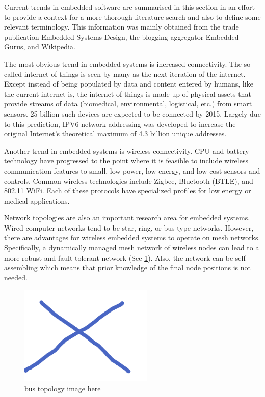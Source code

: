 \documentclass[draftcls,onecolumn,conference,12pt]{IEEEtran}
\begin{document}
Current trends in embedded software are summarised in this section in an effort to provide a context for a more thorough literature search and also to define some relevant terminology.  This information was mainly obtained from the trade publication Embedded Systems Design, the blogging aggregator Embedded Gurus, and Wikipedia.  

The most obvious trend in embedded systems is increased connectivity.  The so-called internet of things is seen by many as the next iteration of the internet. Except instead of being populated by data and content entered by humans, like the current internet is, the internet of things is made up of physical assets that provide streams of data (biomedical, environmental, logistical, etc.) from smart sensors.  25 billion such devices are expected to be connected by 2015. Largely due to this prediction, IPV6 network addressing was developed to increase the original Internet’s theoretical maximum of 4.3 billion unique addresses.  

Another trend in embedded systems is wireless connectivity.  CPU and battery technology have progressed to the point where it is feasible to include wireless communication features to small, low power, low energy, and low cost sensors and controls.  Common wireless technologies include Zigbee, Bluetooth (BTLE), and 802.11 WiFi.  Each of these protocols have specialized profiles for low energy or medical applications.  

Network topologies are also an important research area for embedded systems.  Wired computer networks tend to be star, ring, or bus type networks.  However, there are advantages for wireless embedded systems to operate on mesh networks.  Specifically, a dynamically managed mesh network of wireless nodes can lead to a more robust and fault tolerant network (See \figurename \ref{fig_sim}).  Also, the network can be self-assembling which means that prior knowledge of the final node positions is not needed. 

\begin{figure}[!t]
\centering
\includegraphics[width=2.5in]{topology}
\caption{bus topology image here}
\label{fig_sim}
\end{figure}
\end{document}
